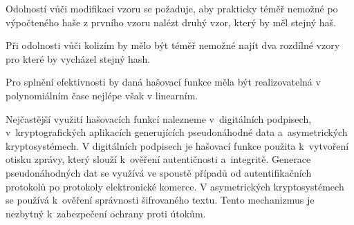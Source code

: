 Odolností vůči modifikaci vzoru se požaduje, aby prakticky téměř nemožné po %
výpočteného haše z prvního vzoru nalézt druhý vzor, který by měl stejný haš.

Při odolnosti vůči kolizím by mělo být téměř nemožné najít dva rozdílné vzory pro které by vycházel stejný hash.\cite{Burda9788021446120ISBN} %

Pro splnění efektivnosti by daná hašovací funkce měla být realizovatelná v polynomiálním čase nejlépe však v linearním.\cite{Mao0130669431ISBN} %

Nejčastější využití hašovacích funkcí nalezneme v~digitálních podpisech, v~kryptografických aplikacích generujících pseudonáhodné data a~asymetrických kryptosystémech. V digitálních podpisech je hašovací funkce použita k~vytvoření otisku zprávy, který slouží k~ověření autentičnosti a~integritě. Generace pseudonáhodných dat se využívá ve spoustě případů od autentifikačních protokolů po protokoly elektronické komerce. V asymetrických kryptosystémech se používá k~ověření správnosti šifrovaného textu. Tento mechanizmus je nezbytný k~zabezpečení ochrany proti útokům.\cite{Mao0130669431ISBN}%
